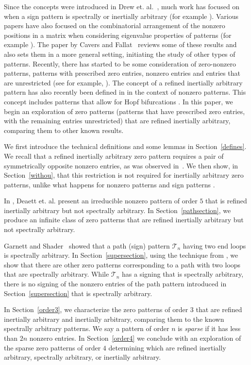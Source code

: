 \documentclass[10pt]{amsart}
\begin{document}
Since the concepts were introduced in Drew et. al.~\cite{Drew}, much work has focused on when
a sign pattern is spectrally or inertially arbitrary (for example \cite{CF, CVV, GS, KOV}). 
Various papers have also focused on the combinatorial arrangement of the nonzero
positions in a matrix when considering eigenvalue properties of patterns (for example \cite{CV4, CM, DOV}).
The paper by Cavers and Fallat~\cite{CF} reviews some of these results and also sets them
in a more general setting, initiating the study of other types of patterns. Recently, there has started to be some
consideration of zero-nonzero patterns, patterns with prescribed zero entries, nonzero entries and
entries that are unrestricted (see for example, \cite{ESV}). The concept of a refined inertially arbitrary
pattern has also recently been defined in \cite{DOV} in the context of nonzero patterns. This concept
includes patterns that allow for Hopf bifurcations \cite{BDMOV}.
In this paper, we begin an exploration of zero patterns (patterns that have prescribed zero entries, 
with the remaining entries unrestricted) that are refined inertially arbitrary, comparing them to 
other known results.
 
We first introduce the technical definitions and some lemmas in Section~\ref{defines}. We recall that a refined inertially arbitrary zero pattern requires a pair of symmetrically opposite nonzero entries, as was observed in~\cite{CF}. We then show, 
in Section~\ref{withou}, that this restriction is not required for inertially arbitrary zero patterns, unlike what happens for nonzero patterns \cite{CV4} and sign patterns \cite{CV}.

In \cite{DOV}, Deaett et. al. present an irreducible nonzero pattern of order $5$ that is refined inertially arbitrary but not
spectrally arbitrary. In Section~\ref{pathsection}, we produce an infinite class of zero patterns that are refined inertially arbitrary
but not spectrally arbitrary. 

Garnett and Shader~\cite{GS} showed that a path (sign) pattern ${\mathcal{T}}_n$ having two end loops is spectrally arbitrary. 
In Section~\ref{supersection}, using the technique from \cite{GS}, we show that there are other zero patterns corresponding to a path with two loops that are spectrally arbitrary. While ${\mathcal{T}}_n$ has a signing that is spectrally arbitrary, there is no signing of the nonzero entries of the path pattern introduced in Section~\ref{supersection} that is spectrally arbitrary.

In Section~\ref{order3}, we characterize the zero patterns of order $3$ that are refined inertially arbitrary and inertially
arbitrary, comparing them to the known spectrally arbitrary patterns. 
We say a pattern of order $n$ is \emph{sparse} if it has less than $2n$ nonzero entries.
In Section~\ref{order4} we conclude with an exploration of the sparse zero patterns of order $4$ 
determining which are refined inertially arbitrary, spectrally arbitrary, or inertially arbitrary.
\end{document}
